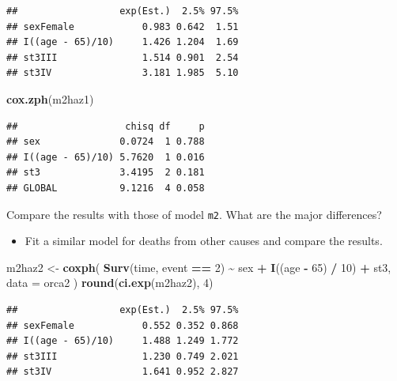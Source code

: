 \documentclass[
]{book}
\newenvironment{Shaded}{\begin{snugshade}}{\end{snugshade}}
\newcommand{\AttributeTok}[1]{\textcolor[rgb]{0.13,0.29,0.53}{#1}}
\newcommand{\DecValTok}[1]{\textcolor[rgb]{0.00,0.00,0.81}{#1}}
\newcommand{\FunctionTok}[1]{\textcolor[rgb]{0.13,0.29,0.53}{\textbf{#1}}}
\newcommand{\NormalTok}[1]{#1}
\newcommand{\OtherTok}[1]{\textcolor[rgb]{0.56,0.35,0.01}{#1}}
\newcommand{\SpecialCharTok}[1]{\textcolor[rgb]{0.81,0.36,0.00}{\textbf{#1}}}
\providecommand{\tightlist}{%
  \setlength{\itemsep}{0pt}\setlength{\parskip}{0pt}}
\begin{document}
\begin{verbatim}
##                  exp(Est.)  2.5% 97.5%
## sexFemale            0.983 0.642  1.51
## I((age - 65)/10)     1.426 1.204  1.69
## st3III               1.514 0.901  2.54
## st3IV                3.181 1.985  5.10
\end{verbatim}

\begin{Shaded}
\begin{Highlighting}[]
\FunctionTok{cox.zph}\NormalTok{(m2haz1)}
\end{Highlighting}
\end{Shaded}

\begin{verbatim}
##                   chisq df     p
## sex              0.0724  1 0.788
## I((age - 65)/10) 5.7620  1 0.016
## st3              3.4195  2 0.181
## GLOBAL           9.1216  4 0.058
\end{verbatim}

Compare the results with those of model \texttt{m2}. What are the major differences?

\begin{itemize}
\tightlist
\item
  Fit a similar model for deaths from other causes and compare the results.
\end{itemize}

\begin{Shaded}
\begin{Highlighting}[]
\NormalTok{m2haz2 }\OtherTok{\textless{}{-}} 
  \FunctionTok{coxph}\NormalTok{(}
    \FunctionTok{Surv}\NormalTok{(time, event }\SpecialCharTok{==} \DecValTok{2}\NormalTok{) }\SpecialCharTok{\textasciitilde{}}\NormalTok{ sex }\SpecialCharTok{+} \FunctionTok{I}\NormalTok{((age }\SpecialCharTok{{-}} \DecValTok{65}\NormalTok{) }\SpecialCharTok{/} \DecValTok{10}\NormalTok{) }\SpecialCharTok{+}\NormalTok{ st3, }
    \AttributeTok{data =}\NormalTok{ orca2}
\NormalTok{  )}
\FunctionTok{round}\NormalTok{(}\FunctionTok{ci.exp}\NormalTok{(m2haz2), }\DecValTok{4}\NormalTok{)}
\end{Highlighting}
\end{Shaded}

\begin{verbatim}
##                  exp(Est.)  2.5% 97.5%
## sexFemale            0.552 0.352 0.868
## I((age - 65)/10)     1.488 1.249 1.772
## st3III               1.230 0.749 2.021
## st3IV                1.641 0.952 2.827
\end{verbatim}
\end{document}
